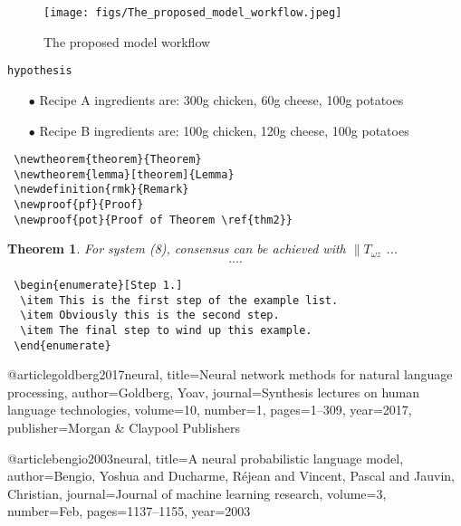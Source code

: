 \begin{figure}
	\centering
		\texttt{[image: figs/The\_proposed\_model\_workflow.jpeg]}
	\caption{The proposed model workflow}
	\label{model_workflow}
\end{figure}


{\verb|hypothesis|}


\begin{enumerate}
\item[$\bullet$] Recipe A ingredients are: 300g chicken, 60g cheese, 100g potatoes
\item[$\bullet$] Recipe B ingredients are: 100g chicken, 120g cheese, 100g potatoes
\end{enumerate}


\begin{verbatim}
 \newtheorem{theorem}{Theorem}
 \newtheorem{lemma}[theorem]{Lemma}
 \newdefinition{rmk}{Remark}
 \newproof{pf}{Proof}
 \newproof{pot}{Proof of Theorem \ref{thm2}}
\end{verbatim}


\newtheorem{theorem}{Theorem}

\begin{theorem}
For system (8), consensus can be achieved with 
$\|T_{\omega z}$ ...
\begin{eqnarray}\label{10}
....
\end{eqnarray}
\end{theorem}


\begin{verbatim}
 \begin{enumerate}[Step 1.]
  \item This is the first step of the example list.
  \item Obviously this is the second step.
  \item The final step to wind up this example.
 \end{enumerate}
\end{verbatim}







@article{goldberg2017neural,
  title={Neural network methods for natural language processing},
  author={Goldberg, Yoav},
  journal={Synthesis lectures on human language technologies},
  volume={10},
  number={1},
  pages={1--309},
  year={2017},
  publisher={Morgan \& Claypool Publishers}
}

@article{bengio2003neural,
  title={A neural probabilistic language model},
  author={Bengio, Yoshua and Ducharme, R{\'e}jean and Vincent, Pascal and Jauvin, Christian},
  journal={Journal of machine learning research},
  volume={3},
  number={Feb},
  pages={1137--1155},
  year={2003}
}


